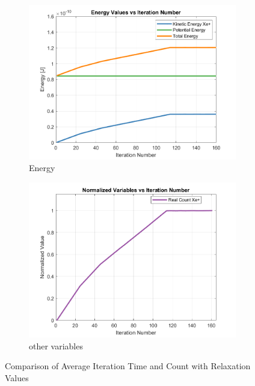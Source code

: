 \begin{figure}[H]
    \centering
    \begin{subfigure}[b]{0.49\linewidth}
        \centering
        \includegraphics[width=\linewidth]{figures/GIT/energy_values.png}
        \caption{Energy}
        \label{fig:average_iteration_time}
    \end{subfigure}
    \hfill
    \begin{subfigure}[b]{0.49\linewidth}
        \centering
        \includegraphics[width=\linewidth]{figures/GIT/normalized_variables.png}
        \caption{other variables}
        \label{fig:average_iteration_count}
    \end{subfigure}
    \caption{Comparison of Average Iteration Time and Count with Relaxation Values}
    \label{fig:comparison}
\end{figure}


